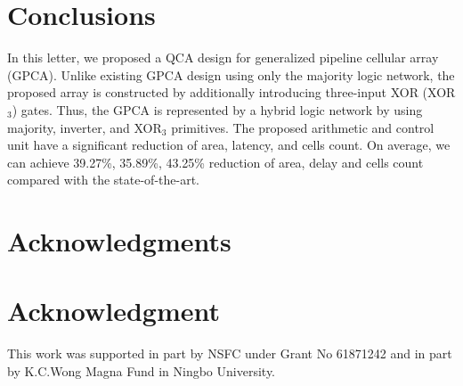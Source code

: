 \documentclass[9pt,journal,compsoc]{IEEEtran}
\begin{document}
\section{Conclusions}
In this letter, we proposed a QCA design for generalized pipeline cellular array (GPCA). 
Unlike existing GPCA design using only the majority logic network, the proposed array is constructed by additionally introducing three-input XOR (XOR$_3$) gates. Thus, the GPCA is represented by a hybrid logic network by using majority, inverter, and XOR$_3$ primitives. The proposed arithmetic and control unit have a significant reduction of area, latency, and cells count. On average, we can achieve 39.27\%, 35.89\%, 43.25\% reduction of area, delay and cells count compared with the state-of-the-art.

\vspace{-2ex}
\ifCLASSOPTIONcompsoc
  \section*{Acknowledgments}
\else
  \section*{Acknowledgment}
\fi
This work was supported in part by NSFC under Grant No 61871242 and in part by K.C.Wong Magna Fund in Ningbo University.
\vspace{-2ex}
\ifCLASSOPTIONcaptionsoff
  \newpage
\fi

\footnotesize


\end{document}
